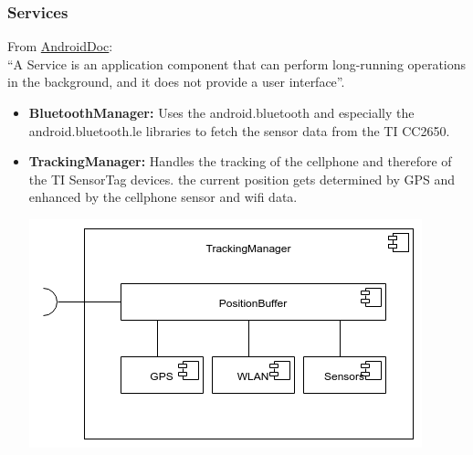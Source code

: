 \subsubsection{Services}
From \href{https://developer.android.com/guide/components/services.html}{AndroidDoc}: \\
``A Service is an application component that can perform long-running operations in the background, and it does not provide a user interface''.
\begin{itemize}
  \item \textbf{BluetoothManager:} Uses the android.bluetooth and especially the android.bluetooth.le libraries to fetch the sensor data from the TI CC2650.
  \item \textbf{TrackingManager:} Handles the tracking of the cellphone and therefore of the TI SensorTag devices. the current position gets determined by GPS and enhanced by the cellphone sensor and wifi data.
  \begin{center}
  \includegraphics[scale=0.4]{pics/TrackingManager_Composition.png}
  \end{center}


\end{itemize}
